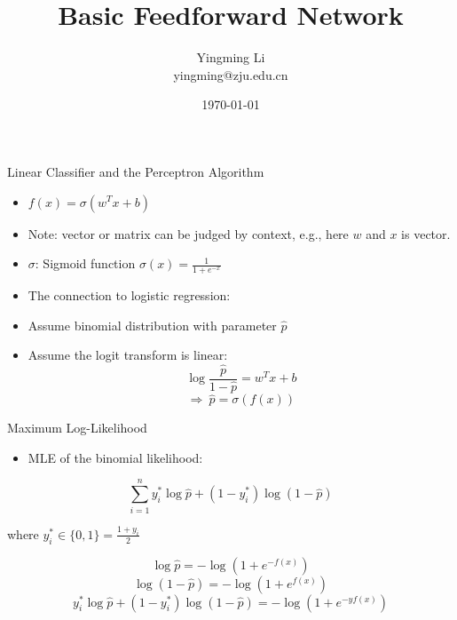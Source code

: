 \documentclass[12pt,notes,mathserif]{beamer}
\title{Basic Feedforward Network}
\author[YingmingLi]{Yingming Li \\ yingming@zju.edu.cn}
\institute[DSERC, ZJU]{Data Science \& Engineering Research Center, ZJU}
\date[\today]{\today}
\providecommand{\tightlist}{%
	\setlength{\itemsep}{0pt}\setlength{\parskip}{0pt}}
\begin{document}

\begin{frame}[c]
	\titlepage
\end{frame}

\section{}\label{section}

\begin{frame}{Linear Classifier and the Perceptron Algorithm}

\begin{itemize}
\item
  \(f(x)=\sigma(w^T{x}+b)\)
\item
  Note: vector or matrix can be judged by context, e.g., here \(w\) and
  \(x\) is vector.
\item
  \(\sigma\): Sigmoid function \(\sigma(x)=\frac{1}{1+e^{-x}}\)
\item
  The connection to logistic regression:
\item
  Assume binomial distribution with parameter \(\hat{p}\)
\item
  Assume the logit transform is linear:
  \[\log\frac{\hat{p}}{1-\hat{p}}=w^{{T}}x+b\]
  \[\Rightarrow\ \hat{p}=\sigma(f(x))\]
\end{itemize}

\end{frame}

\begin{frame}{Maximum Log-Likelihood}

\begin{itemize}
\tightlist
\item
  MLE of the binomial likelihood:
\end{itemize}

\[\sum_{i=1} ^{n} y_i^* \log \hat{p} + (1-{y}_{i}^{*})\log(1-\hat{p})\]

where \({y}_{i}^{*}\in \{0,1\} =\frac{1+y_{i}}{2}\)

\[\log\hat{p}=-\log(1+e^{-f(x)})\] \[\log(1-\hat{p})=-\log(1+e^{f(x)})\]
\[{y}_{{i}}^{*}\log\hat{p}+(1-{y}_{i}^{*})\log(1-\hat{p})=-\log(1+e^{-yf(x)})\]

\end{frame}
\end{document}
